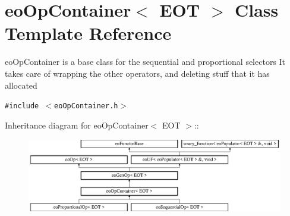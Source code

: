 \section{eo\-Op\-Container$<$ EOT $>$ Class Template Reference}
\label{classeo_op_container}
eo\-Op\-Container is a base class for the sequential and proportional selectors It takes care of wrapping the other operators, and deleting stuff that it has allocated  


{\tt \#include $<$eo\-Op\-Container.h$>$}

Inheritance diagram for eo\-Op\-Container$<$ EOT $>$::\begin{figure}[H]
\begin{center}
\leavevmode
\includegraphics[height=3.18544cm]{classeo_op_container}
\end{center}
\end{figure}
